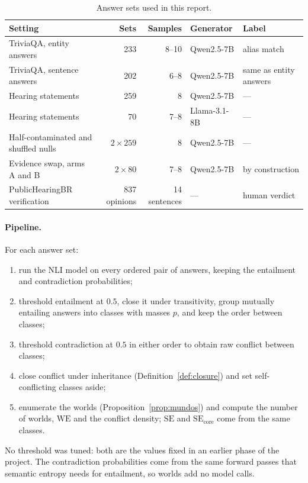 \documentclass[english]{desafiokunumi}
\theoremstyle{definition}
\theoremstyle{remark}
\newcommand{\SE}{\mathrm{SE}}
\newcommand{\SEc}{\mathrm{SE}_{\mathrm{core}}}
\newcommand{\WE}{\mathrm{WE}}
\begin{document}
\begin{table}[ht]
  \centering
  \caption{Answer sets used in this report.}
  \label{tab:settings}
  \small
  \begin{tabular}{@{}lrrll@{}}
    \toprule
    \textbf{Setting} & \textbf{Sets} & \textbf{Samples} & \textbf{Generator} & \textbf{Label} \\
    \midrule
    TriviaQA, entity answers        & 233 & 8--10 & Qwen2.5-7B   & alias match \\
    TriviaQA, sentence answers      & 202 & 6--8  & Qwen2.5-7B   & same as entity answers \\
    Hearing statements              & 259 & 8     & Qwen2.5-7B   & --- \\
    Hearing statements              & 70  & 7--8  & Llama-3.1-8B & --- \\
    Half-contaminated and shuffled nulls & $2 \times 259$ & 8 & Qwen2.5-7B & --- \\
    Evidence swap, arms A and B     & $2 \times 80$ & 7--8 & Qwen2.5-7B & by construction \\
    PublicHearingBR verification    & 837 opinions & 14 sentences & --- & human verdict \\
    \bottomrule
  \end{tabular}
\end{table}

\paragraph{Pipeline.} For each answer set:
\begin{enumerate}\setlength{\itemsep}{1pt}
  \item run the NLI model on every ordered pair of answers, keeping the
  entailment and contradiction probabilities;
  \item threshold entailment at $0.5$, close it under transitivity, group
  mutually entailing answers into classes with masses $p$, and keep the order
  between classes;
  \item threshold contradiction at $0.5$ in either order to obtain raw
  conflict between classes;
  \item close conflict under inheritance (Definition~\ref{def:closure}) and
  set self-conflicting classes aside;
  \item enumerate the worlds (Proposition~\ref{prop:mundos}) and compute the
  number of worlds, $\WE$ and the conflict density; $\SE$ and $\SEc$ come from
  the same classes.
\end{enumerate}
No threshold was tuned: both are the values fixed in an earlier phase of the
project. The contradiction probabilities come from the same forward passes that
semantic entropy needs for entailment, so worlds add no model calls.
\end{document}
